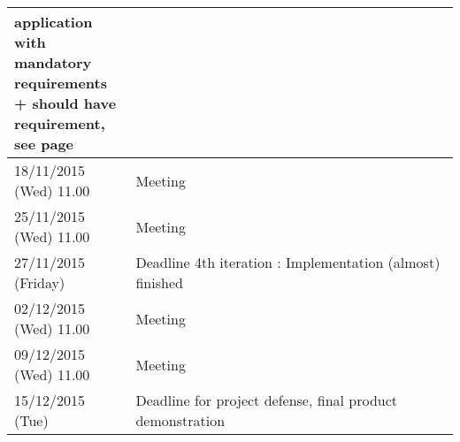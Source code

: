 \begin{longtable}{|p{0.275\linewidth}|p{0.725\linewidth}|}
    application with mandatory requirements + should have requirement,
    see page~\pageref{shouldhave}\\
    \hline
    18/11/2015 (Wed) 11.00 & Meeting \\
    \hline
    25/11/2015 (Wed) 11.00 & Meeting \\
    \hline
    27/11/2015 (Friday) & Deadline 4th iteration : Implementation (almost)
    finished \\
    \hline
    02/12/2015 (Wed) 11.00 & Meeting \\
    \hline
    09/12/2015 (Wed) 11.00 & Meeting \\
    \hline
    15/12/2015 (Tue) & Deadline for project defense, final product
    demonstration \\
    \hline
\end{longtable}
